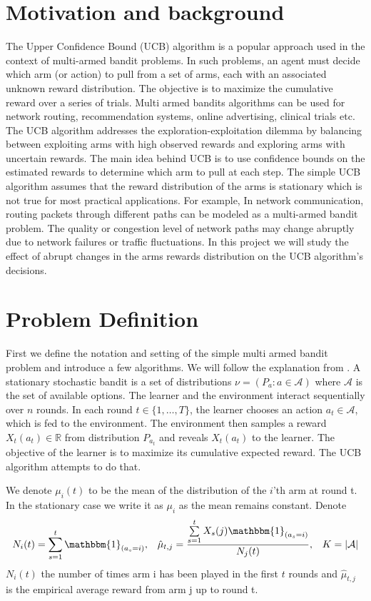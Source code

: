 \documentclass[opre,nonblindrev]{informs3} %
\begin{document}
\section{Motivation and background}
The Upper Confidence Bound (UCB) algorithm is a popular approach used in the context of multi-armed bandit problems. In such problems, an agent must decide which arm (or action) to pull from a set of arms, each with an associated unknown reward distribution. The objective is to maximize the cumulative reward over a series of trials.
Multi armed bandits algorithms can be used for network routing, recommendation systems, online advertising, clinical trials etc.
The UCB algorithm addresses the exploration-exploitation dilemma by balancing between exploiting arms with high observed rewards and exploring arms with uncertain rewards. The main idea behind UCB is to use confidence bounds on the estimated rewards to determine which arm to pull at each step.
The simple UCB algorithm assumes that the reward distribution of the arms is stationary which is not true for most practical applications. For example, In network communication, routing packets through different paths can be modeled as a multi-armed bandit problem. The quality or congestion level of network paths may change abruptly due to network failures or traffic fluctuations.
In this project we will study the effect of abrupt changes in the arms rewards distribution on the UCB algorithm’s decisions.


\section{Problem Definition}
First we define the notation and setting of the simple multi armed bandit problem and introduce a few algorithms. We will follow the explanation from \cite{reference1}. A stationary stochastic bandit is a set of distributions $\nu=(P_a:a\in\mathcal{A})$ where $\mathcal{A}$ is the set of available options. The learner and the environment interact sequentially over $n$ rounds. In each round $t \in \{1, \ldots, T\}$, the learner chooses an action $a_t \in \mathcal{A}$, which is fed to the environment. The environment then samples a reward $X_t(a_t) \in \mathbb{R}$ from distribution $P_{a_t}$ and reveals $X_t(a_t)$ to the learner. The objective of the learner is to maximize its cumulative expected reward. The UCB algorithm attempts to do that.

We denote $\mu_i(t)$ to be the mean of the distribution of the $i$'th arm at round t. In the stationary case we write it as $\mu_i$ as the mean remains constant.
Denote
\[
\begin{aligned}
    N_i(t) = \sum\limits_{s=1}^{t}\mathbbm{1}_{(a_s=i)}, & \quad \hat{\mu}_{t,j} = \frac{\sum\limits_{s=1}^{t}X_s(j)\mathbbm{1}_{(a_s=i)}}{N_j(t)}, & K = |\mathcal{A}|
\end{aligned}
\]
$N_i(t)$ the number of times arm i has been played in the first $t$ rounds and $\hat{\mu}_{t,j}$ is the empirical average reward from arm j up to round t.
\end{document}
